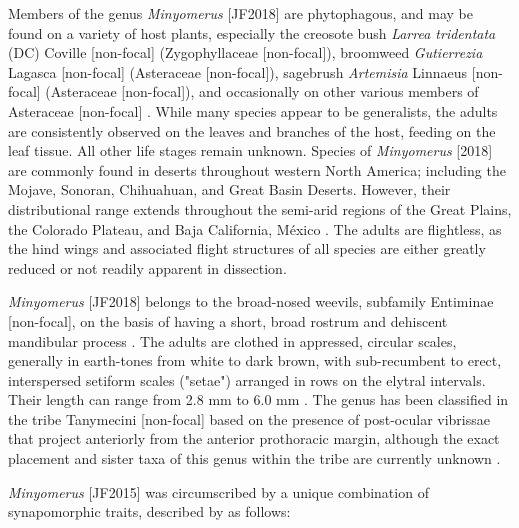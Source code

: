 \documentclass[fleqn,10pt,lineno]{wlpeerj} %
\begin{document}
	Members of the genus \textit{Minyomerus} [JF2018] are phytophagous, and may be found on a variety of host plants, especially the creosote bush \textit{Larrea tridentata} (DC) Coville [non-focal] (Zygophyllaceae [non-focal]), broomweed \textit{Gutierrezia} Lagasca [non-focal] (Asteraceae [non-focal]), sagebrush \textit{Artemisia} Linnaeus [non-focal] (Asteraceae [non-focal]), and occasionally on other various members of Asteraceae [non-focal] \citep{jansen2015}. 
	While many species appear to be generalists, the adults are consistently observed on the leaves and branches of the host, feeding on the leaf tissue. All other life stages remain unknown.
	Species of \textit{Minyomerus} [2018] are commonly found in deserts throughout western North America; including the Mojave, Sonoran, Chihuahuan, and Great Basin Deserts. However, their distributional range extends throughout the semi-arid regions of the Great Plains, the Colorado Plateau, and Baja California, M\'{e}xico \citep{obrien1982, jansen2015}. 
	The adults are flightless, as the hind wings and associated flight structures of all species are either greatly reduced or not readily apparent in dissection.
		
	\textit{Minyomerus} [JF2018] belongs to the broad-nosed weevils, subfamily Entiminae [non-focal], on the basis of having a short, broad rostrum and dehiscent mandibular process \citep{marvaldi1997, anderson2002, oberprieler2007, oberprieler2014, marvaldi2014}.
	The adults are clothed in appressed, circular scales, generally in earth-tones from white to dark brown, with sub-recumbent to erect, interspersed setiform scales ("setae") arranged in rows on the elytral intervals. Their length can range from 2.8 mm to 6.0 mm \citep{jansen2015}.
	The genus has been classified in the tribe Tanymecini [non-focal] based on the presence of post-ocular vibrissae that project anteriorly from the anterior prothoracic margin, although the exact placement and sister taxa of this genus within the tribe are currently unknown \citep{howden1959, howden1970, howden1982, jansen2015}.
		
	\textit{Minyomerus} [JF2015] was circumscribed by a unique combination of synapomorphic traits, described by \citet{jansen2015} as follows:
	
\end{document}
